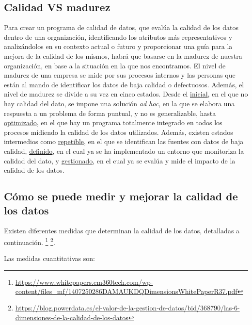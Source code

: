 \documentclass{article}
\begin{document}
\subsection{Calidad VS madurez}
Para crear un programa de calidad de datos, que evalúa la calidad de los datos dentro de una organización, identificando los atributos más representativos y analizándolos en su contexto actual o futuro y proporcionar una guía para la mejora de la calidad de los mismos, habrá que basarse en la madurez de nuestra organización, en base a la situación en la que nos encontramos. El nivel de madurez de una empresa se mide por sus procesos internos y las personas que están al mando de identificar los datos de baja calidad o defectuosos. Además, el nivel de madurez se divide a su vez en cinco estados. Desde el \underline{inicial}, en el que no hay calidad del dato, se impone una solución \textit{ad hoc}, en la que se elabora una respuesta a un problema de forma puntual, y no es generalizable, hasta \underline{optimizado}, en el que hay un programa totalmente integrado en todos los procesos midiendo la calidad de los datos utilizados. Además, existen estados intermedios como \underline{repetible}, en el que se identifican las fuentes con datos de baja calidad, \underline{definido}, en el cual ya se ha implementado un entorno que monitoriza la calidad del dato, y \underline{gestionado}, en el cual ya se evalúa y mide el impacto de la calidad de los datos.

\subsection{Cómo se puede medir y mejorar la calidad de los datos}
Existen diferentes medidas que determinan la calidad de los datos, detalladas a continuación. \footnote{\url{https://www.whitepapers.em360tech.com/wp-content/files_mf/1407250286DAMAUKDQDimensionsWhitePaperR37.pdf}} \footnote{\url{https://blog.powerdata.es/el-valor-de-la-gestion-de-datos/bid/368790/las-6-dimensiones-de-la-calidad-de-los-datos}}.

Las medidas cuantitativas son:
\end{document}
